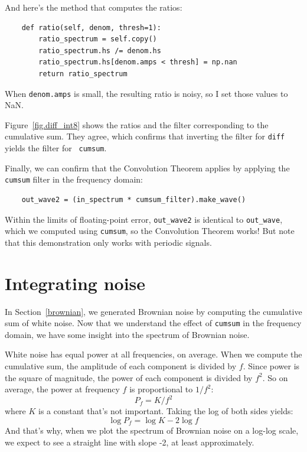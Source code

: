 \documentclass[12pt]{book}
\begin{document}
And here's the method that computes the ratios:

\begin{verbatim}
    def ratio(self, denom, thresh=1):
        ratio_spectrum = self.copy()
        ratio_spectrum.hs /= denom.hs
        ratio_spectrum.hs[denom.amps < thresh] = np.nan
        return ratio_spectrum
\end{verbatim}

When {\tt denom.amps} is small, the resulting ratio is noisy,
so I set those values to NaN.

Figure~\ref{fig.diff_int8} shows the ratios and the filter
corresponding to the cumulative sum.  They agree, which confirms that
inverting the filter for {\tt diff} yields the filter for {\tt
  cumsum}.

Finally, we can confirm that the Convolution Theorem applies by
applying the {\tt cumsum} filter in the frequency domain:

\begin{verbatim}
    out_wave2 = (in_spectrum * cumsum_filter).make_wave()
\end{verbatim}

Within the limits of floating-point error, \verb"out_wave2" is
identical to \verb"out_wave", which we computed using {\tt cumsum}, so
the Convolution Theorem works!  But note that this demonstration only
works with periodic signals.


\section{Integrating noise}

In Section~\ref{brownian}, we generated Brownian noise by computing the
cumulative sum of white noise.
Now that we understand the effect of {\tt cumsum} in the frequency
domain, we have some insight into the spectrum of Brownian noise.

White noise has equal power at all frequencies, on average.  When we
compute the cumulative sum, the amplitude of each component is divided
by $f$.  Since power is the square of magnitude, the power of each
component is divided by $f^2$.  So on average, the power at frequency
$f$ is proportional to $1 / f^2$:
%
\[ P_f = K / f^2 \]
%
where $K$ is a constant that's not important.
Taking the log of both sides yields:
%
\[ \log P_f = \log K - 2 \log f \]
%
And that's why, when we plot the spectrum of Brownian noise on a
log-log scale, we expect to see a straight line with slope -2, at
least approximately.
\end{document}
